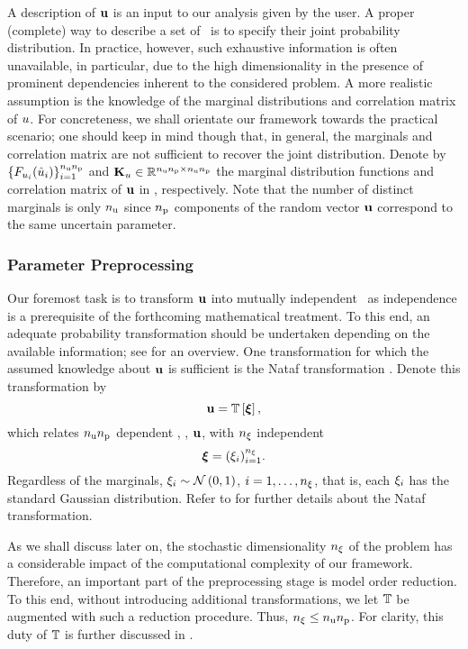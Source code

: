 A description of $\mathbf{u}$ is an input to our analysis given by the user.
A proper (complete) way to describe a set of \rvs\ is to specify their joint probability distribution.
In practice, however, such exhaustive information is often unavailable, in particular, due to the high dimensionality in the presence of prominent dependencies inherent to the considered problem.
A more realistic assumption is the knowledge of the marginal distributions and correlation matrix of $u$.
For concreteness, we shall orientate our framework towards the practical scenario; one should keep in mind though that, in general, the marginals and correlation matrix are not sufficient to recover the joint distribution.
Denote by $\{ F_{u_i}(\hat{u}_i) \}_{i = 1}^{{n_\text{u}} {n_\text{p}}}$ and $\mathbf{K}_u \in \mathbb{R}^{{n_\text{u}} {n_\text{p}} \times {n_\text{u}} {n_\text{p}}}$ the marginal distribution functions and correlation matrix of $\mathbf{u}$ in , respectively.
Note that the number of distinct marginals is only ${n_\text{u}}$ since ${n_\text{p}}$ components of the random vector $\mathbf{u}$ correspond to the same uncertain parameter.

\subsubsection{Parameter Preprocessing} 
Our foremost task is to transform $\mathbf{u}$ into mutually independent \rvs\ as independence is a prerequisite of the forthcoming mathematical treatment.
To this end, an adequate probability transformation should be undertaken depending on the available information; see \cite{eldred2008} for an overview.
One transformation for which the assumed knowledge about $\mathbf{u}$ is sufficient is the Nataf transformation \cite{li2008}.
Denote this transformation by
\begin{equation} \elab{probability-transformation}
  \vu = \transformation{\vz},
\end{equation}
which relates ${n_\text{u}} {n_\text{p}}$ dependent \rvs, \ie, $\mathbf{u}$, with ${n_\xi}$ independent \rvs
\begin{equation} \elab{independent-random-variables}
  \vz = (\z_i)_{i = 1}^\nvars.
\end{equation}
Regardless of the marginals, $\xi_i \sim \mathcal{N}\left( 0, 1 \right)$, $i = 1, \dots, {n_\xi}$, that is, each $\xi_i$ has the standard Gaussian distribution.
Refer to  for further details about the Nataf transformation.

As we shall discuss later on, the stochastic dimensionality ${n_\xi}$ of the problem has a considerable impact of the computational complexity of our framework.
Therefore, an important part of the preprocessing stage is model order reduction.
To this end, without introducing additional transformations, we let $\transformation$ be augmented with such a reduction procedure.
Thus, ${n_\xi} \leq {n_\text{u}} {n_\text{p}}$.
For clarity, this duty of $\transformation$ is further discussed in .


